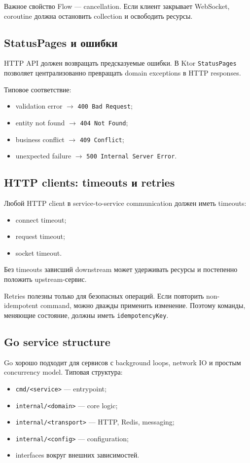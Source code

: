 \documentclass[12pt,a4paper]{article}
\begin{document}
Важное свойство Flow --- cancellation. Если клиент закрывает WebSocket, coroutine
должна остановить collection и освободить ресурсы.

\subsection{StatusPages и ошибки}

HTTP API должен возвращать предсказуемые ошибки. В Ktor \texttt{StatusPages}
позволяет централизованно превращать domain exceptions в HTTP responses.

Типовое соответствие:
\begin{itemize}
    \item validation error $\rightarrow$ \texttt{400 Bad Request};
    \item entity not found $\rightarrow$ \texttt{404 Not Found};
    \item business conflict $\rightarrow$ \texttt{409 Conflict};
    \item unexpected failure $\rightarrow$ \texttt{500 Internal Server Error}.
\end{itemize}

\subsection{HTTP clients: timeouts и retries}

Любой HTTP client в service-to-service communication должен иметь timeouts:
\begin{itemize}
    \item connect timeout;
    \item request timeout;
    \item socket timeout.
\end{itemize}

Без timeouts зависший downstream может удерживать ресурсы и постепенно положить
upstream-сервис.

Retries полезны только для безопасных операций. Если повторить non-idempotent
command, можно дважды применить изменение. Поэтому команды, меняющие состояние,
должны иметь \texttt{idempotencyKey}.

\subsection{Go service structure}

Go хорошо подходит для сервисов с background loops, network IO и простым
concurrency model. Типовая структура:
\begin{itemize}
    \item \texttt{cmd/<service>} --- entrypoint;
    \item \texttt{internal/<domain>} --- core logic;
    \item \texttt{internal/<transport>} --- HTTP, Redis, messaging;
    \item \texttt{internal/<config>} --- configuration;
    \item interfaces вокруг внешних зависимостей.
\end{itemize}
\end{document}
